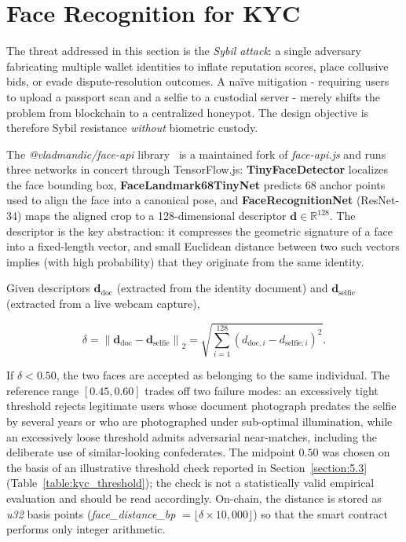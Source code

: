 \section{Face Recognition for KYC}
\label{section:3.5}

The threat addressed in this section is the \emph{Sybil attack}: a single adversary fabricating multiple wallet identities to inflate reputation scores, place collusive bids, or evade dispute-resolution outcomes. A naïve mitigation - requiring users to upload a passport scan and a selfie to a custodial server - merely shifts the problem from blockchain to a centralized honeypot. The design objective is therefore Sybil resistance \emph{without} biometric custody.

The \emph{@vladmandic/face-api} library~\cite{vladmandic2021faceapi} is a maintained fork of \emph{face-api.js} and runs three networks in concert through TensorFlow.js: \textbf{TinyFaceDetector} localizes the face bounding box, \textbf{FaceLandmark68TinyNet} predicts 68 anchor points used to align the face into a canonical pose, and \textbf{FaceRecognitionNet} (ResNet-34) maps the aligned crop to a 128-dimensional descriptor $\mathbf{d} \in \mathbb{R}^{128}$. The descriptor is the key abstraction: it compresses the geometric signature of a face into a fixed-length vector, and small Euclidean distance between two such vectors implies (with high probability) that they originate from the same identity.

Given descriptors $\mathbf{d}_{\text{doc}}$ (extracted from the identity document) and $\mathbf{d}_{\text{selfie}}$ (extracted from a live webcam capture),

\begin{equation}
    \delta = \left\| \mathbf{d}_{\text{doc}} - \mathbf{d}_{\text{selfie}} \right\|_2 = \sqrt{\sum_{i=1}^{128} \left( d_{\text{doc},i} - d_{\text{selfie},i} \right)^2}.
\end{equation}

If $\delta < 0.50$, the two faces are accepted as belonging to the same individual. The reference range $[0.45, 0.60]$ trades off two failure modes: an excessively tight threshold rejects legitimate users whose document photograph predates the selfie by several years or who are photographed under sub-optimal illumination, while an excessively loose threshold admits adversarial near-matches, including the deliberate use of similar-looking confederates. The midpoint $0.50$ was chosen on the basis of an illustrative threshold check reported in Section~\ref{section:5.3} (Table~\ref{table:kyc_threshold}); the check is not a statistically valid empirical evaluation and should be read accordingly. On-chain, the distance is stored as \emph{u32} basis points (\emph{face\_distance\_bp} $= \lfloor \delta \times 10{,}000 \rfloor$) so that the smart contract performs only integer arithmetic.

